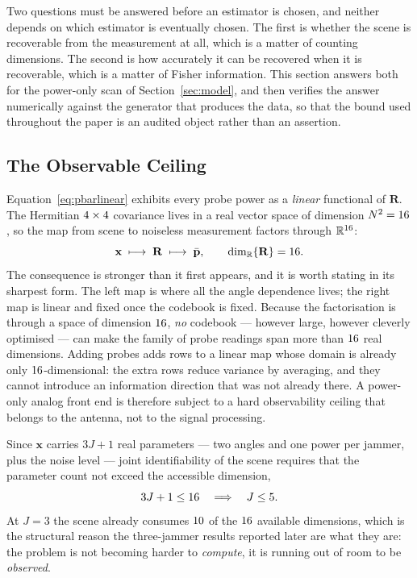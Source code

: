 \documentclass[journal]{IEEEtran}
\newcommand{\Rt}{\mathbf{R}}
\newcommand{\pv}{\mathbf{p}}
\begin{document}
Two questions must be answered before an estimator is chosen, and neither
depends on which estimator is eventually chosen. The first is whether the scene
is recoverable from the measurement at all, which is a matter of counting
dimensions. The second is how accurately it can be recovered when it is
recoverable, which is a matter of Fisher information. This section answers both
for the power-only scan of Section~\ref{sec:model}, and then verifies the
answer numerically against the generator that produces the data, so that the
bound used throughout the paper is an audited object rather than an assertion.

\subsection{The Observable Ceiling}
\label{sec:bounds:ceiling}

Equation~\eqref{eq:pbarlinear} exhibits every probe power as a \emph{linear}
functional of $\Rt$. The Hermitian $4\times4$ covariance lives in
a real vector space of dimension $N^2 = 16$, so the map from scene to
noiseless measurement factors through $\mathbb{R}^{16}$:
\begin{equation}
\mathbf{x} \;\longmapsto\; \Rt \;\longmapsto\; \bar{\pv},
\qquad
\dim_{\mathbb{R}} \{\Rt\} = \dObs .
\label{eq:factor}
\end{equation}
The consequence is stronger than it first appears, and it is worth stating in
its sharpest form. The left map is where all the angle dependence lives; the
right map is linear and fixed once the codebook is fixed. Because the
factorisation is through a space of dimension $16$, \emph{no} codebook ---
however large, however cleverly optimised --- can make the family of probe
readings span more than $16$ real dimensions. Adding probes adds rows to a
linear map whose domain is already only $16$-dimensional: the extra rows
reduce variance by averaging, and they cannot introduce an information
direction that was not already there. A power-only analog front end is
therefore subject to a hard observability ceiling that belongs to the antenna,
not to the signal processing.

Since $\mathbf{x}$ carries $3J + 1$ real parameters --- two angles and one
power per jammer, plus the noise level --- joint identifiability of the scene
requires that the parameter count not exceed the accessible dimension,
\begin{equation}
3J + 1 \le 16
\quad\Longrightarrow\quad
J \le 5 .
\label{eq:jmax}
\end{equation}
At $J = 3$ the scene already consumes $10$ of the $16$ available
dimensions, which is the structural reason the three-jammer results reported
later are what they are: the problem is not becoming harder to \emph{compute},
it is running out of room to be \emph{observed}.
\end{document}

